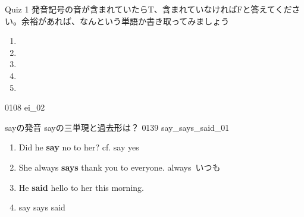 \documentclass[aspectratio=169, xcolor={dvipsnames,table}]{beamer}
\begin{document}
\begin{frame}[plain]{Quiz 1}
  発音記号の音が含まれていたらT、含まれていなければFと答えてください。余裕があれば、なんという単語か書き取ってみましょう

  \LARGE
  \begin{enumerate}
    \item \mbox{}\hspace{40pt}\hspace{150pt}\mbox{}

    \item \mbox{}\hspace{40pt}\hspace{150pt}\mbox{}

    \item \mbox{}\hspace{40pt}\hspace{150pt}\mbox{}

    \item \mbox{}\hspace{40pt}\hspace{150pt}\mbox{}

    \item \mbox{}\hspace{40pt}\hspace{150pt}\mbox{}
  \end{enumerate}
  \hfill{\tiny 0108}\,{\scriptsize {}\,{\tiny ei\_02}}
\end{frame}
\begin{frame}[plain]{sayの発音}
  sayの三単現と過去形は？%
  \hfill{\tiny 0139}\,{\scriptsize {}\,{\tiny say\_says\_said\_01}}
  \pause
  \large
  \begin{enumerate}[<+->]
    \item Did he \textbf{say} no to her?%
          \hfill{}{\footnotesize cf. say yes}
    \item She always \textbf{says} thank you to everyone.%
          \hfill{}{\footnotesize always  \,いつも}
    \item He \textbf{said} hello to her this morning.%
    \item say {}\hspace{40pt}says {}\hspace{40pt}said {}
  \end{enumerate}
\end{frame}
\end{document}
